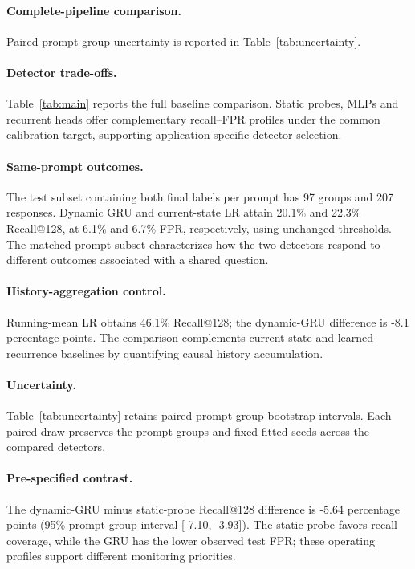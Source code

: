 \paragraph{Complete-pipeline comparison.}\AchievementDetectionEN{} Paired prompt-group uncertainty is reported in Table~\ref{tab:uncertainty}.



\paragraph{Detector trade-offs.}Table~\ref{tab:main} reports the full baseline comparison. Static probes, MLPs and recurrent heads offer complementary recall--FPR profiles under the common calibration target, supporting application-specific detector selection.





\paragraph{Same-prompt outcomes.}The test subset containing both final labels per prompt has 97 groups and 207 responses. Dynamic GRU and current-state LR attain 20.1\% and 22.3\% Recall@128, at 6.1\% and 6.7\% FPR, respectively, using unchanged thresholds. The matched-prompt subset characterizes how the two detectors respond to different outcomes associated with a shared question.

\paragraph{History-aggregation control.}Running-mean LR obtains 46.1\% Recall@128; the dynamic-GRU difference is -8.1 percentage points. The comparison complements current-state and learned-recurrence baselines by quantifying causal history accumulation.

\paragraph{Uncertainty.}Table~\ref{tab:uncertainty} retains paired prompt-group bootstrap intervals. Each paired draw preserves the prompt groups and fixed fitted seeds across the compared detectors.

\paragraph{Pre-specified contrast.}The dynamic-GRU minus static-probe Recall@128 difference is -5.64 percentage points (95\% prompt-group interval [-7.10, -3.93]). The static probe favors recall coverage, while the GRU has the lower observed test FPR; these operating profiles support different monitoring priorities.

